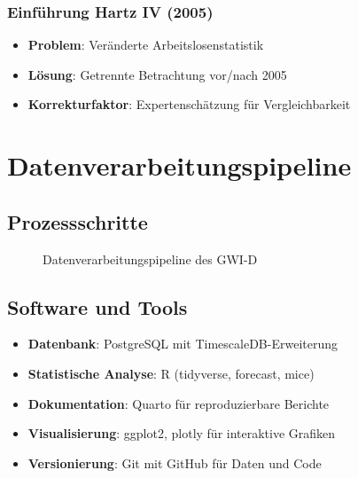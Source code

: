 \subsubsection{Einführung Hartz IV (2005)}
\begin{itemize}
\item \textbf{Problem}: Veränderte Arbeitslosenstatistik
\item \textbf{Lösung}: Getrennte Betrachtung vor/nach 2005
\item \textbf{Korrekturfaktor}: Expertenschätzung für Vergleichbarkeit
\end{itemize}

\section{Datenverarbeitungspipeline}

\subsection{Prozessschritte}

\begin{figure}[ht]
\centering
{}
\caption{Datenverarbeitungspipeline des GWI-D}
\label{fig:datenpipeline}
\end{figure}

\subsection{Software und Tools}

\begin{itemize}
\item \textbf{Datenbank}: PostgreSQL mit TimescaleDB-Erweiterung
\item \textbf{Statistische Analyse}: R (tidyverse, forecast, mice)
\item \textbf{Dokumentation}: Quarto für reproduzierbare Berichte
\item \textbf{Visualisierung}: ggplot2, plotly für interaktive Grafiken
\item \textbf{Versionierung}: Git mit GitHub für Daten und Code
\end{itemize}

